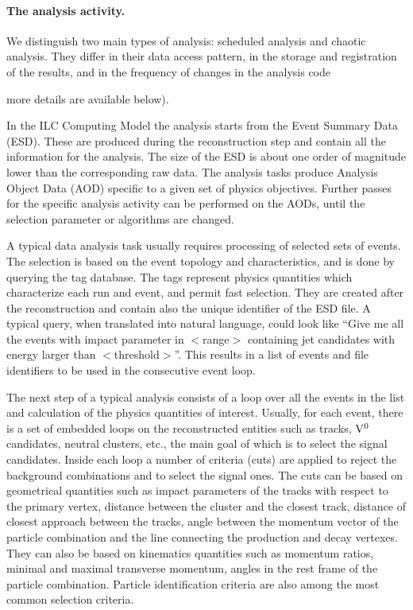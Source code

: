 \documentclass[12pt,a4paper,twoside]{article}
\begin{document}
\paragraph{The analysis activity.}
\noindent
We distinguish two main types of analysis: scheduled analysis and
chaotic analysis. They differ in their data access pattern, in the
storage and registration of the results, and in the frequency of
changes in the analysis code {more details are available below).

In the ILC Computing Model the analysis starts from the Event Summary
Data (ESD). These are produced during the reconstruction step and contain
all the information for the analysis. The size of the ESD is
about one order of magnitude lower than the corresponding raw
data.  The analysis tasks produce Analysis
Object Data (AOD) specific to a given set of physics objectives. 
Further passes for the specific analysis activity can be performed on
the AODs, until the selection parameter or algorithms are changed.

A typical data analysis task usually requires processing of
selected sets of events. The selection is based on the event
topology and characteristics, and is done by querying the tag
database.  The tags represent physics quantities which characterize 
each run and event, and permit fast selection. They are created
after the reconstruction and contain also the unique
identifier of the ESD file. A typical query, when translated into
natural language, could look like ``Give me  
all the events with impact parameter in $<$range$>$
containing jet candidates with energy larger than $<$threshold$>$''.
This results in a list of events and file identifiers to be used in the
consecutive event loop. 


The next step of a typical analysis consists of a loop over all the events
in the list and calculation of the physics quantities of
interest. Usually, for each event, there is a set of embedded loops on the
reconstructed entities such as tracks, ${\rm V^0}$ candidates, neutral
clusters, etc., the main goal of which is to select the signal
candidates. Inside each loop a number of criteria (cuts) are applied to
reject the background combinations and to select the signal ones. The
cuts can be based on geometrical quantities such as impact parameters
of the tracks with 
respect to the primary vertex, distance between the cluster and the
closest track, distance of closest approach between the tracks,
angle between the momentum vector of the particle combination
and the line connecting the production and decay vertexes. They can
also be based on  
kinematics quantities such as momentum ratios, minimal and maximal
transverse momentum, 
angles in the rest frame of the particle combination. 
Particle identification criteria are also among the most common
selection criteria.

}
\end{document}
